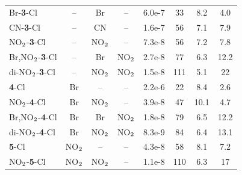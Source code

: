 \documentclass{tufte-handout}
\begin{document}
\begin{table}[h!]
\begin{tabular}{l c c c S S S S}
Br-\textbf{3}-Cl               &  --           &  Br             &  --           &      6.0e-7    &   33    &   8.2   &   4.0 \\
CN-\textbf{3}-Cl               &  --           &  CN             &  --           &      1.6e-7    &   56    &   7.1   &   7.9 \\
NO$\rm _2$-\textbf{3}-Cl       &  --           &  NO$\rm _2$     &  --           &      7.3e-8    &   56    &   7.2   &   7.8 \\
Br,NO$\rm _2$-\textbf{3}-Cl    &  --           &  Br             &  NO$\rm _2$   &      2.7e-8    &   77    &   6.3   &   12.2 \\
di-NO$\rm _2$-\textbf{3}-Cl    &  --           &  NO$\rm _2$     &  NO$\rm _2$   &      1.5e-8    &   111   &   5.1   &   22 \\
\noalign{\medskip}        
\textbf{4}-Cl                  &  Br           &   --            &  --           &      2.2e-6    &   22    &   8.4   &   2.6  \\
NO$\rm _2$-\textbf{4}-Cl       &  Br           &  NO$\rm _2$     &  --           &      3.9e-8    &   47    &   10.1  &   4.7  \\
Br,NO$\rm _2$-\textbf{4}-Cl    &  Br           &  Br             &  NO$\rm _2$   &      1.8e-8    &   79    &   6.5   &   12.2 \\
di-NO$\rm _2$-\textbf{4}-Cl    &  Br           &  NO$\rm _2$     &  NO$\rm _2$   &      8.3e-9    &   84    &   6.4   &   13.1 \\
\noalign{\medskip}
\textbf{5}-Cl                  &  NO$\rm _2$   &   --            &  --           &      4.3e-8    &   58    &   8.1   &   7.2 \\
NO$\rm _2$-\textbf{5}-Cl       &  NO$\rm _2$   &  NO$\rm _2$     &  --           &      1.1e-8    &   110   &   6.3   &   17 \\



    \end{tabular}
    \label{tab:1}
\end{table}
\end{document}
